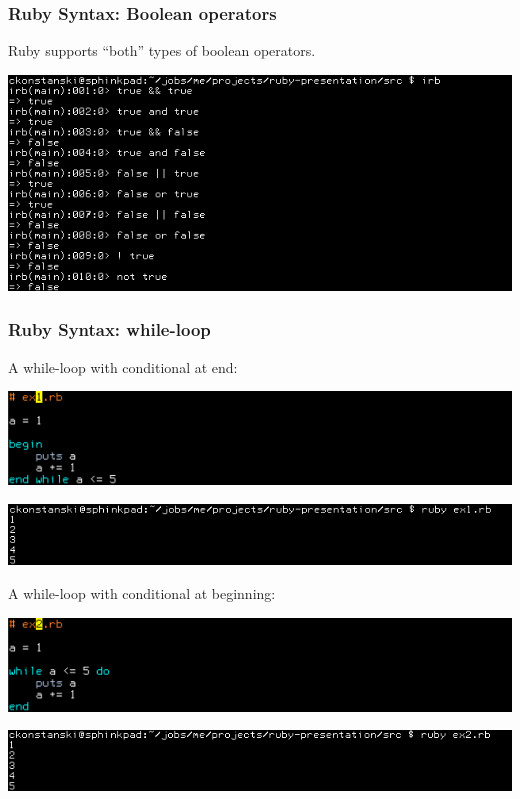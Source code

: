 \documentclass[helvetica,english,utf8,notitle,nologo]{beamer}
\begin{document}
\begin{frame}
  \frametitle{Ruby Syntax: Boolean operators}

  Ruby supports ``both'' types of boolean operators.

  \includegraphics[scale=0.5]{irb_5}
\end{frame}

\begin{frame}
  \frametitle{Ruby Syntax: while-loop}

  A while-loop with conditional at end:

  \includegraphics[scale=0.53]{src_1}

  \includegraphics[scale=0.5]{out_1}

  A while-loop with conditional at beginning:

  \includegraphics[scale=0.53]{src_2}

  \includegraphics[scale=0.5]{out_2}
\end{frame}
\end{document}
